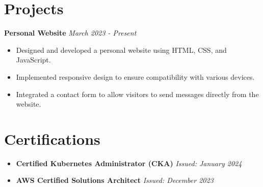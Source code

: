 \documentclass[a4paper,10pt]{article}
\begin{document}
\section*{Projects}
\noindent
\textbf{Personal Website} \hfill \textit{March 2023 - Present}\\
\begin{itemize}[leftmargin=0.15in]
    \item Designed and developed a personal website using HTML, CSS, and JavaScript.
    \item Implemented responsive design to ensure compatibility with various devices.
    \item Integrated a contact form to allow visitors to send messages directly from the website.
\end{itemize}

\section*{Certifications}
\begin{itemize}[leftmargin=0.15in]
    \item \textbf{Certified Kubernetes Administrator (CKA)} \hfill \textit{Issued: January 2024}
    \item \textbf{AWS Certified Solutions Architect} \hfill \textit{Issued: December 2023}
\end{itemize}
\end{document}
